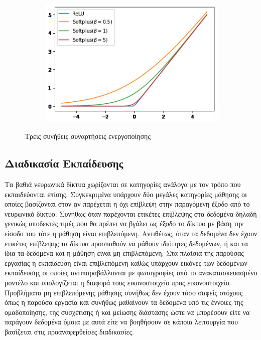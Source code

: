 \begin{figure}[ht]
\begin{subfigure}{0.3\textwidth}
    \includegraphics[width=\linewidth]{images/chapter2_img/softplus_graph.jpg}
    \label{subfig:softplus}
  \end{subfigure}
  \caption{Τρεις συνήθεις συναρτήσεις ενεργοποίησης}
\end{figure}

\subsection*{Διαδικασία Εκπαίδευσης}
\par
    Τα βαθιά νευρωνικά δίκτυα χωρίζονται σε κατηγορίες ανάλογα με τον τρόπο που 
    εκπαιδεύονται επίσης. Συγκεκριμένα υπάρχουν δύο μεγάλες κατηγορίες μάθησης οι οποίες βασίζονται στον αν παρέχεται η όχι επίβλεψη στην παραγόμενη έξοδο από το νευρωνικό δίκτυο. Συνήθως όταν παρέχονται ετικέτες επίβλεψης στα δεδομένα δηλαδή γενικώς αποδεκτές τιμές που θα πρέπει να βγάλει ως έξοδο το δίκτυο με βάση την είσοδο του τότε η μάθηση είναι επιβλεπόμενη. Αντιθέτως, όταν τα δεδομένα δεν έχουν ετικέτες επίβλεψης τα δίκτυα προσπαθούν να μάθουν ιδιότητες δεδομένων, ή και τα ίδια τα δεδομένα και η μάθηση είναι μη επιβλεπόμενη. Στα πλαίσια της παρούσας εργασίας η εκπαίδευση είναι επιβλεπόμενη καθώς υπάρχουν εικόνες των δεδομένων εκπαίδευσης οι οποίες αντιπαραβάλλονται με φωτογραφίες από το ανακατασκευασμένο  μοντέλο και υπολογίζεται η διαφορά τους εικονοστοιχείο προς εικονοστοιχείο. Προβλήματα μη επιβλεπόμενης μάθησης συνήθως δεν έχουν τόσο σαφείς στόχους όπως η παρούσα εργασία και συνήθως μαθαίνουν τα δεδομένα υπό τις έννοιες της ομαδοποίησης, της συσχέτισης ή και μείωσης διάστασης ώστε να μπορέσουν είτε να παράγουν δεδομένα όμοια με αυτά είτε να βοηθήσουν σε κάποια λειτουργία που βασίζεται στις προαναφερθείσες διαδικασίες. 

